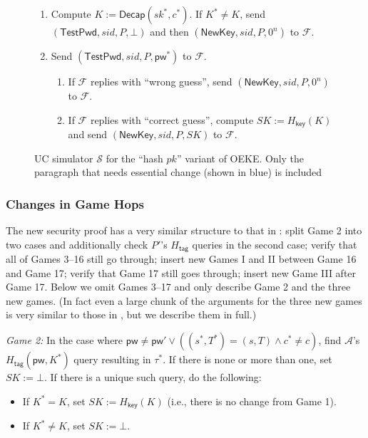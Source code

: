 \documentclass{article}
\theoremstyle{plain}
\theoremstyle{definition}
\theoremstyle{remark}
\newcommand{\adv}{\mathcal{A}}
\renewcommand{\sim}{\mathcal{S}}
\newcommand{\func}{\mathcal{F}}
\newcommand{\Decap}{\mathsf{Decap}}
\newcommand{\Hkey}{H_\mathsf{key}}
\newcommand{\Htag}{H_\mathsf{tag}}
\newcommand{\pw}{\mathsf{pw}}
\newcommand{\TestPwd}{\mathsf{TestPwd}}
\newcommand{\NewKey}{\mathsf{NewKey}}
\begin{document}
\begin{figure}[H]
\begin{framed}
\begin{small}
\begin{enumerate}
\begin{enumerate}
        \item Compute $K := \Decap(sk^*,c^*)$. If $K^* \neq K$, send $(\TestPwd, sid, P, \bot)$ and then $(\NewKey, sid, P, 0^n)$ to $\func$.
        \item Send $(\TestPwd, sid, P, \pw^*)$ to $\func$.
            \begin{enumerate}
              \item If $\func$ replies with ``wrong guess'', send $(\NewKey, sid, P, 0^n)$ to $\func$.
              \item If $\func$ replies with ``correct guess'', compute $SK := \Hkey(K)$ and send $(\NewKey, sid, P, SK)$ to $\func$.
            \end{enumerate}
      \end{enumerate}
\end{enumerate}
\end{small}
\end{framed}
\caption{UC simulator $\sim$ for the ``hash $pk$'' variant of OEKE. Only the paragraph that needs essential change (shown in {\color{blue}blue}) is included}
\label{fig:oeke-sim-hash-pw}
\end{figure}

\subsubsection{Changes in Game Hops}
\label{app:game-hops-hash-pw}
The new security proof has a very similar structure to that in : split Game 2 into two cases and additionally check $P'$'s $\Htag$ queries in the second case; verify that all of Games 3--16 still go through; insert new Games I and II between Game 16 and Game 17; verify that Game 17 still goes through; insert new Game III after Game 17. Below we omit Games 3--17 and only describe Game 2 and the three new games. (In fact even a large chunk of the arguments for the three new games is very similar to those in , but we describe them in full.)

\medskip\noindent\emph{Game 2:} In the case where $\pw \neq \pw' \lor ((s^*,T^*) = (s,T) \land c^* \neq c)$, find $\adv$'s $\Htag(\pw,K^*)$ query resulting in $\tau^*$. If there is none or more than one, set $SK := \bot$. If there is a unique such query, do the following:
\begin{itemize}
  \item If $K^* = K$, set $SK := \Hkey(K)$ (i.e., there is no change from Game 1).
  \item If $K^* \neq K$, set $SK := \bot$.
\end{itemize}
\end{document}
